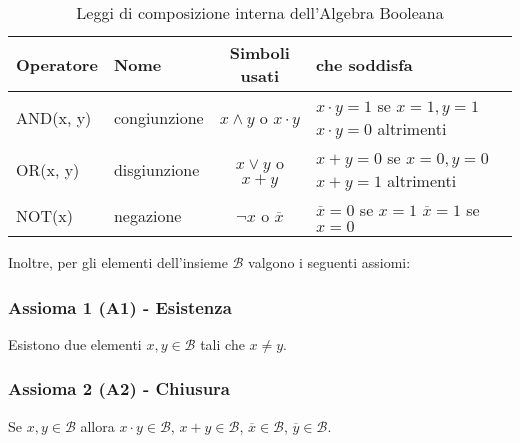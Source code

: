 \documentclass[a4paper]{extarticle}
\begin{document}
\begin{table}[H]
    \centering
    \begin{tabularx}{\textwidth}{l|l|c|P}
         \textbf{Operatore} & \textbf{Nome} & \textbf{Simboli usati} & \textbf{che soddisfa}\\
         \hline
         AND(x, y) & congiunzione & \(x \wedge y\) \hspace{0.5em} o \hspace{0.5em} \(x \cdot y\) & \parbox{\linewidth}{\(x \cdot y = 1\) se \(x = 1, y = 1\)\\ \(x \cdot y = 0\) altrimenti}\\
         OR(x, y) & disgiunzione & \hspace{0.2em} \(x \vee y\) \hspace{0.5 em} o \hspace{0.5em} \(x + y\) & \parbox{\linewidth}{\(x + y = 0\) se \(x = 0, y = 0\)\\ \(x + y = 1\) altrimenti}\\
         NOT(x) & negazione & \(\neg x\) \hspace{1em} o \hspace{1em} \(\overline{x}\) & \parbox{\linewidth}{\(\overline{x} = 0\) se \(x = 1\) \\ \(\overline{x} = 1\) se \(x = 0\)}\\
    \end{tabularx}
    \caption{Leggi di composizione interna dell'Algebra Booleana}
    \label{tab:leggi_composizione_interna}
\end{table}

\noindent
Inoltre, per gli elementi dell'insieme \(\mathcal{B}\) valgono i seguenti assiomi:

\subsubsection{Assioma 1 (A1) - Esistenza}
Esistono due elementi \(x, y \in \mathcal{B}\) tali che \(x \neq y\).

\subsubsection{Assioma 2 (A2) - Chiusura}
Se \(x, y \in \mathcal{B}\) allora \hspace{1em} \(x \cdot y \in \mathcal{B}\), \hspace{1em} \(x + y \in \mathcal{B}\), \hspace{1em} \(\overline{x} \in \mathcal{B}\), \hspace{1em} \(\overline{y} \in \mathcal{B}\).
\end{document}
